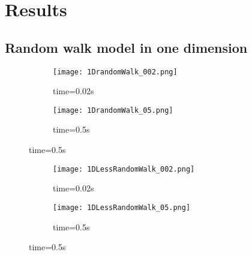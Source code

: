 \documentclass[a4paper,11pt]{article}
\newcommand{\secti}[1]{\centering \section{{#1}} \justifying} %
\begin{document}
\secti{Results}

\subsection{Random walk model in one dimension}
    \begin{figure}[H]
        \caption{Random walk model $10^6$ walkers $\Delta t = 0.00005$}
        \captionsetup[subfigure]{labelformat=empty}
        \begin{subfigure}[b!]{0.55\textwidth}
            \texttt{[image: 1DrandomWalk\_002.png]}
            \caption{time=0.02s}
        \end{subfigure}
        \begin{subfigure}[b!]{0.55\textwidth}
            \texttt{[image: 1DrandomWalk\_05.png]}
            \caption{time=0.5s}
        \end{subfigure}
    \end{figure}
    \begin{figure}[H]
        \caption{Random walk model $10^3$ walkers $\Delta t = 0.00005$}
        \captionsetup[subfigure]{labelformat=empty}
        \begin{subfigure}[b!]{0.55\textwidth}
            \texttt{[image: 1DLessRandomWalk\_002.png]}
            \caption{time=0.02s}
        \end{subfigure}
        \begin{subfigure}[b!]{0.55\textwidth}
            \texttt{[image: 1DLessRandomWalk\_05.png]}
            \caption{time=0.5s}
        \end{subfigure}
    \end{figure}
\end{document}
